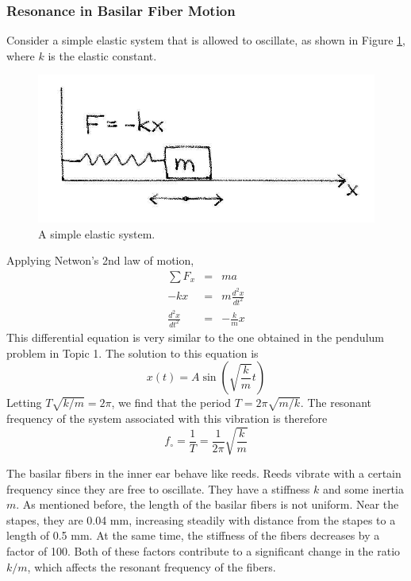 \subsubsection{Resonance in Basilar Fiber Motion}

Consider a simple elastic system that is allowed to oscillate, as shown in Figure \ref{Fig3-10}, where $k$ is the elastic constant.  
 \begin{figure}[htb]
 	\centering
	\includegraphics[width=5in]{./figures/Topic3/Fig3-10.jpg}
	\caption{A simple elastic system.}
 	\label{Fig3-10}
 \end{figure}
Applying Netwon’s 2nd law of motion,
\begin{eqnarray}\label{eqn3-17}
	\sum F_x &=& ma\nonumber\\
	-kx &=& m \frac{d^2x}{dt^2}\nonumber\\
	\frac{d^2x}{dt^2} &=& -\frac{k}{m}x 
\end{eqnarray}
This differential equation is very similar to the one obtained in the pendulum problem in Topic 1.  The solution to this equation is 
 \begin{equation}\label{eqn3-18}
	 x(t) = A \sin\left(\sqrt{\frac{k}{m}}t\right)
 \end{equation}
Letting $T\sqrt{k/m} = 2\pi$, we find that the period $T=2\pi\sqrt{m/k}$. The resonant frequency of the system associated with this vibration is therefore
$$f_{\circ}=\frac{1}{T} = \frac{1}{2\pi}\sqrt{\frac{k}{m}}$$

The basilar fibers in the inner ear behave like reeds.  Reeds vibrate with a certain frequency since they are free to oscillate.  They have a stiffness $k$ and some inertia $m$.  As mentioned before, the length of the basilar fibers is not uniform.  Near the stapes, they are 0.04 mm, increasing steadily with distance from the stapes to a length of 0.5 mm.  At the same time, the stiffness of the fibers decreases by a factor of 100.  Both of these factors contribute to a significant change in the ratio $k/m$, which affects the resonant frequency of the fibers.

